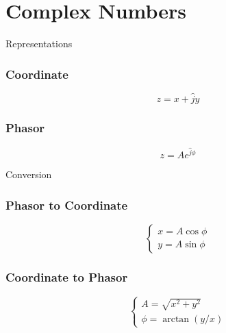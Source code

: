 \documentclass{../templates/topic}
\begin{document}
\chapter{Complex Numbers}

\begin{section}{Representations}
	
	\subsection{Coordinate}
		\begin{equation*}
			z=x+\hat{j}y
		\end{equation*}
	
	\subsection{Phasor}
		\begin{equation*}
			z=Ae^{\hat{j}\phi}
		\end{equation*}
		
\end{section}

\begin{section}{Conversion}
	
	\subsection{Phasor to Coordinate}
		\begin{equation*}
			\begin{cases}
				x = A\cos{\phi}\\
				y = A\sin{\phi}
			\end{cases}
		\end{equation*}
	
	\subsection{Coordinate to Phasor}
		\begin{equation*}
			\begin{cases}
				A = \sqrt{x^2+y^2}\\
				\phi = \arctan(y/x)
			\end{cases}
		\end{equation*}
	
\end{section}
\end{document}
